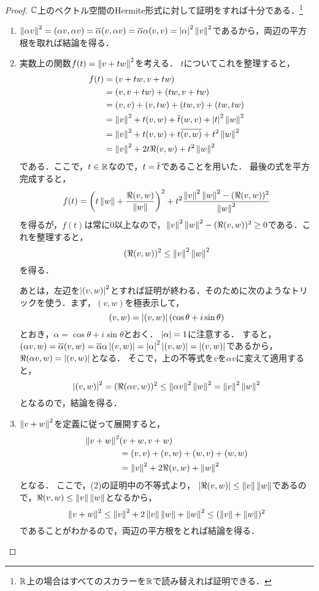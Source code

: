 \begin{proof}
$\mathbb{C}$上のベクトル空間のHermite形式に対して証明をすれば十分である．\footnote{$\mathbb{R}$上の場合はすべてのスカラーを$\mathbb{R}$で読み替えれば証明できる．}
\begin{enumerate}
  \item $\left\| \alpha v \right\|^2 = (\alpha v, \alpha v) = \overline{\alpha} (v,\alpha v) = \overline{\alpha}\alpha (v,v)=\left|\alpha\right|^2 \left\| v \right\|^2$であるから，両辺の平方根を取れば結論を得る．
  \item 実数上の関数$f(t) = \left\| v + tw \right\|^2$を考える．
  $t$についてこれを整理すると，
  \[
    \begin{aligned}
      f(t) &= (v+tw,v+tw) \\
      &= (v,v+tw) + (tw, v+tw) \\
      &= (v,v) + (v, tw) + (tw,v) + (tw,tw) \\
      &= \left\| v \right\|^2 + t(v,w) + \overline{t}(w,v) + \left|t\right|^2 \left\| w \right\|^2 \\
      &= \left\| v \right\|^2 + t(v,w) + t\overline{(v,w)} + t^2 \left\| w \right\|^2 \\
      &= \left\| v \right\|^2 + 2 t \Re (v,w) + t^2 \left\| w \right\|^2
    \end{aligned}
  \]
  である．ここで，$t \in \mathbb{R}$なので，$t = \overline{t}$であることを用いた．
  最後の式を平方完成すると，
  \[
    f(t) = \left(t \norm{w} + \frac{\Re (v,w)}{\norm{w}} \right)^2 %
    + t^2 \frac{\norm{v}^2 \norm{w}^2 - (\Re (v,w))^2}{\norm{w}^2}
  \]
  を得るが，$f(t)$は常に0以上なので，$\left\| v \right\|^2 \left\| w \right\|^2 - (\Re (v,w))^2 \ge 0$である．これを整理すると，
  \[
    (\Re (v,w))^2 \le \left\| v \right\|^2 \left\| w \right\|^2  
  \]
  を得る．

  あとは，左辺を$\left|(v,w)\right|^2$とすれば証明が終わる．そのために次のようなトリックを使う．まず，$(v,w)$を極表示して，
  \[
    (v,w) = \left|(v,w)\right|(\cos \theta + i \sin \theta)  
  \]
  とおき，$\alpha = \cos \theta + i \sin \theta$とおく．
  $\left|\alpha\right| = 1$に注意する．
  すると，$(\alpha v, w) = \overline{\alpha}(v,w) = \overline{\alpha}\alpha \left|(v,w)\right| = \left|\alpha\right|^2 \left|(v,w)\right| = \left|(v,w)\right|$であるから，$\Re (\alpha v, w) = \left|(v,w)\right|$となる．
  そこで，上の不等式を$v$を$\alpha v$に変えて適用すると，
  \[
      \left|(v,w)\right|^2 = (\Re (\alpha v, w))^2 \le \left\| \alpha v \right\|^2 \left\| w \right\|^2 = \left\| v \right\|^2 \left\| w \right\|^2
  \]
  となるので，結論を得る．
  \item $\left\| v+w \right\|^2$を定義に従って展開すると，
  \[
    \begin{aligned}
      \left\| v+w \right\|^2 & (v+w,v+w) \\
      &= (v,v) + (v,w) + (w,v) + (w,w) \\
      &= \left\| v \right\|^2 + 2\Re (v,w) + \left\| w \right\|^2
    \end{aligned}
  \]
  となる．
  ここで，(2)の証明中の不等式より，
  $\left|\Re (v,w)\right| \le \left\| v \right\|\left\| w \right\|$であるので，$\Re (v,w) \le \left\| v \right\|\left\| w \right\|$となるから，
  \[
    \left\| v+w \right\|^2 \le \left\| v \right\|^2 + 2\left\| v \right\|\left\| w \right\| + \left\| w \right\|^2 \le (\left\| v \right\|+\left\| w \right\|)^2
  \]
  であることがわかるので，両辺の平方根をとれば結論を得る．
\end{enumerate}
\end{proof}
